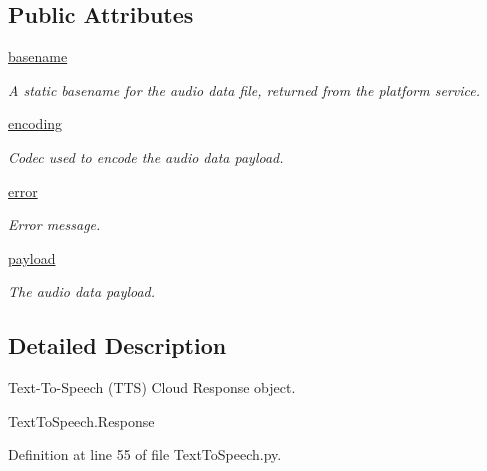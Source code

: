 \subsection*{Public Attributes}
\begin{DoxyCompactItemize}
\item 
\hyperlink{classRappCloud_1_1CloudMsgs_1_1TextToSpeech_1_1TextToSpeech_1_1Response_ac0fac3eba876ff415ac7f8d48abfb91c}{basename}
\begin{DoxyCompactList}\small\item\em A static basename for the audio data file, returned from the platform service. \end{DoxyCompactList}\item 
\hyperlink{classRappCloud_1_1CloudMsgs_1_1TextToSpeech_1_1TextToSpeech_1_1Response_a241dd8ebf6abe024e6b628755566585b}{encoding}
\begin{DoxyCompactList}\small\item\em Codec used to encode the audio data payload. \end{DoxyCompactList}\item 
\hyperlink{classRappCloud_1_1CloudMsgs_1_1TextToSpeech_1_1TextToSpeech_1_1Response_a18ca271f996e2f5393a05f6496fbaaf5}{error}
\begin{DoxyCompactList}\small\item\em Error message. \end{DoxyCompactList}\item 
\hyperlink{classRappCloud_1_1CloudMsgs_1_1TextToSpeech_1_1TextToSpeech_1_1Response_aeda29307874af91698814140144d1149}{payload}
\begin{DoxyCompactList}\small\item\em The audio data payload. \end{DoxyCompactList}\end{DoxyCompactItemize}


\subsection{Detailed Description}
\begin{DoxyVerb}Text-To-Speech (TTS) Cloud Response object.

TextToSpeech.Response
\end{DoxyVerb}
 

Definition at line 55 of file Text\-To\-Speech.\-py.



